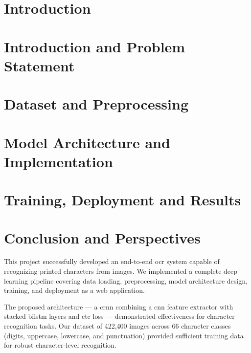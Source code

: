 \documentclass[a4paper, oneside, 12pt, final]{extreport}
\begin{document}
\chapter*{Introduction}
\label{chap:general_introduction}


\chapter{Introduction and Problem Statement}
\label{chap:chapterone}


\chapter{Dataset and Preprocessing}
\label{chap:2}


\chapter{Model Architecture and Implementation}
\label{chap:3}


\chapter{Training, Deployment and Results}
\label{chap:4}


\chapter*{Conclusion and Perspectives}
\label{chap:conclusion}

This project successfully developed an end-to-end \gls{ocr} system capable of recognizing
printed characters from images. We implemented a complete deep learning pipeline covering
data loading, preprocessing, model architecture design, training, and deployment as a
web application.

The proposed architecture — a \gls{crnn} combining a \gls{cnn} feature extractor with
stacked \gls{bilstm} layers and \gls{ctc} loss — demonstrated effectiveness for character
recognition tasks. Our dataset of 422,400 images across 66 character classes (digits,
uppercase, lowercase, and punctuation) provided sufficient training data for robust
character-level recognition.
\end{document}
